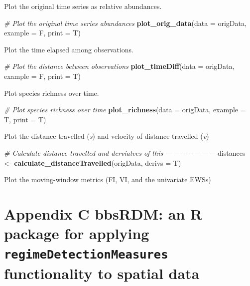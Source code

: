 \documentclass[12pt,twoside,openany]{reedthesis}
\newenvironment{Shaded}{\begin{snugshade}}{\end{snugshade}}
\newcommand{\CommentTok}[1]{\textcolor[rgb]{0.56,0.35,0.01}{\textit{#1}}}
\newcommand{\DataTypeTok}[1]{\textcolor[rgb]{0.13,0.29,0.53}{#1}}
\newcommand{\KeywordTok}[1]{\textcolor[rgb]{0.13,0.29,0.53}{\textbf{#1}}}
\newcommand{\NormalTok}[1]{#1}
\newcommand{\StringTok}[1]{\textcolor[rgb]{0.31,0.60,0.02}{#1}}
\begin{document}
Plot the original time series as relative abundances.
\begin{Shaded}
\begin{Highlighting}[]
\CommentTok{# Plot the original time series abundances}
\KeywordTok{plot_orig_data}\NormalTok{(}\DataTypeTok{data =}\NormalTok{ origData,}
               \DataTypeTok{example =}\NormalTok{ F,}
               \DataTypeTok{print =}\NormalTok{ T)}
\end{Highlighting}
\end{Shaded}
Plot the time elapsed among observations.
\begin{Shaded}
\begin{Highlighting}[]
\CommentTok{# Plot the distance between observations}
\KeywordTok{plot_timeDiff}\NormalTok{(}\DataTypeTok{data =}\NormalTok{ origData,}
              \DataTypeTok{example =}\NormalTok{ F,}
              \DataTypeTok{print =}\NormalTok{ T)}
\end{Highlighting}
\end{Shaded}
Plot species richness over time.
\begin{Shaded}
\begin{Highlighting}[]
\CommentTok{# Plot species richness over time}
\KeywordTok{plot_richness}\NormalTok{(}\DataTypeTok{data =}\NormalTok{ origData,}
              \DataTypeTok{example =}\NormalTok{ T,}
              \DataTypeTok{print =}\NormalTok{ T)}
\end{Highlighting}
\end{Shaded}
Plot the distance travelled (\emph{s}) and velocity of distance travelled (\emph{v})
\begin{Shaded}
\begin{Highlighting}[]
\CommentTok{# Calculate distance travelled and derviatves of this ---------------------}
\NormalTok{distances <-}\StringTok{ }\KeywordTok{calculate_distanceTravelled}\NormalTok{(origData, }\DataTypeTok{derivs =}\NormalTok{ T)}
\end{Highlighting}
\end{Shaded}
Plot the moving-window metrics (FI, VI, and the univariate EWSs)

\appendix

\hypertarget{bbsRDM}{%
\chapter*{\texorpdfstring{Appendix C bbsRDM: an R package for applying \texttt{regimeDetectionMeasures} functionality to spatial data}{Appendix C bbsRDM: an R package for applying regimeDetectionMeasures functionality to spatial data}}\label{bbsRDM}}
\end{document}

